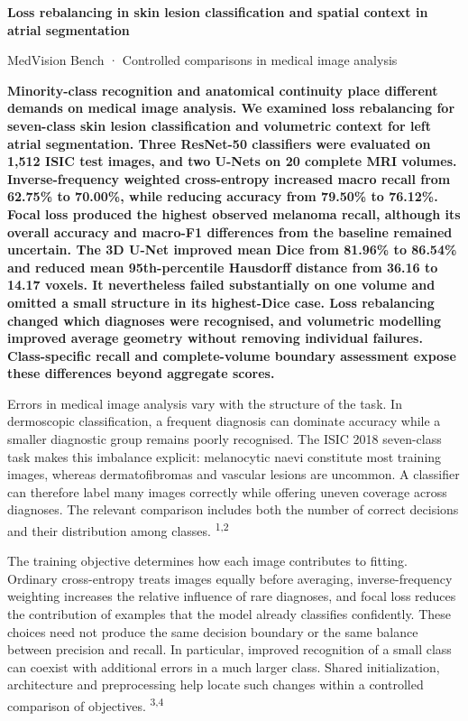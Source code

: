 \documentclass[11pt,a4paper]{article}
\begin{document}
{\raggedright\fontsize{21}{24}\selectfont\bfseries Loss rebalancing in skin lesion classification and spatial context in atrial segmentation\par}\vspace{3mm}

{\sffamily\footnotesize\color{gray} MedVision Bench · Controlled comparisons in medical image analysis\par}\vspace{3mm}

{\bfseries Minority-class recognition and anatomical continuity place different demands on medical image analysis. We examined loss rebalancing for seven-class skin lesion classification and volumetric context for left atrial segmentation. Three ResNet-50 classifiers were evaluated on 1,512 ISIC test images, and two U-Nets on 20 complete MRI volumes. Inverse-frequency weighted cross-entropy increased macro recall from 62.75\% to 70.00\%, while reducing accuracy from 79.50\% to 76.12\%. Focal loss produced the highest observed melanoma recall, although its overall accuracy and macro-F1 differences from the baseline remained uncertain. The 3D U-Net improved mean Dice from 81.96\% to 86.54\% and reduced mean 95th-percentile Hausdorff distance from 36.16 to 14.17 voxels. It nevertheless failed substantially on one volume and omitted a small structure in its highest-Dice case. Loss rebalancing changed which diagnoses were recognised, and volumetric modelling improved average geometry without removing individual failures. Class-specific recall and complete-volume boundary assessment expose these differences beyond aggregate scores.\par}\vspace{3mm}

Errors in medical image analysis vary with the structure of the task. In dermoscopic classification, a frequent diagnosis can dominate accuracy while a smaller diagnostic group remains poorly recognised. The ISIC 2018 seven-class task makes this imbalance explicit: melanocytic naevi constitute most training images, whereas dermatofibromas and vascular lesions are uncommon. A classifier can therefore label many images correctly while offering uneven coverage across diagnoses. The relevant comparison includes both the number of correct decisions and their distribution among classes. \textsuperscript{1,2}



The training objective determines how each image contributes to fitting. Ordinary cross-entropy treats images equally before averaging, inverse-frequency weighting increases the relative influence of rare diagnoses, and focal loss reduces the contribution of examples that the model already classifies confidently. These choices need not produce the same decision boundary or the same balance between precision and recall. In particular, improved recognition of a small class can coexist with additional errors in a much larger class. Shared initialization, architecture and preprocessing help locate such changes within a controlled comparison of objectives. \textsuperscript{3,4}
\end{document}
